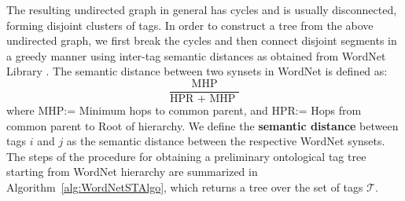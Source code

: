 \indent The resulting undirected graph in general has cycles and is usually disconnected, forming disjoint clusters of tags. In order to construct a tree from the above undirected graph, we first break the cycles and then connect disjoint segments in a greedy manner using inter-tag semantic distances as obtained from WordNet Library \cite{RitaLibraryWordNet}. The semantic distance between two synsets in WordNet is defined as: 
\begin{equation}
\frac{\text{ MHP }}{\text{HPR + MHP }}
\label{eq:ritaDistance} 
\end{equation} 
where 
MHP:= Minimum hops to common parent, and 
HPR:= Hops from common parent to Root of hierarchy. We define the \textbf{semantic distance} between tags $i$ and $j$ as the semantic distance between the respective WordNet synsets. 
The steps of the procedure for obtaining a preliminary ontological tag tree starting from WordNet hierarchy are summarized in Algorithm~\ref{alg:WordNetSTAlgo}, which returns a tree over the set of tags $\mathcal{T}$. 

